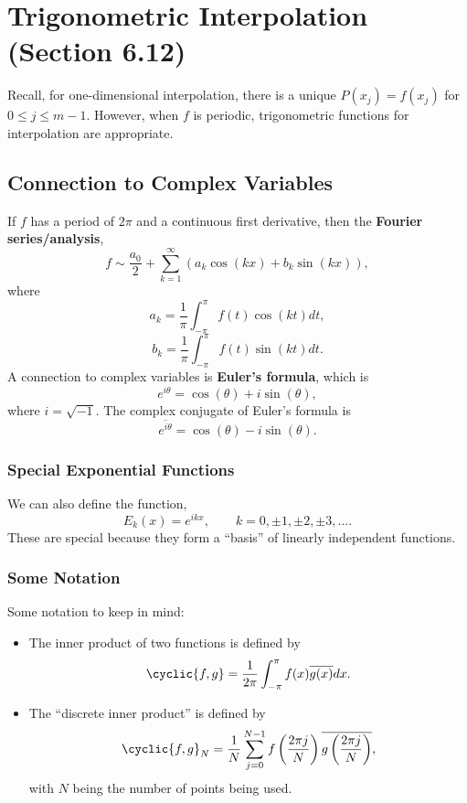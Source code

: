 \documentclass[letterpaper]{article}
\begin{document}
\section{Trigonometric Interpolation (Section 6.12)}
Recall, for one-dimensional interpolation, there is a unique $P(x_j) = f(x_j)$ for $0 \leq j \leq m - 1$. However, when $f$ is periodic, trigonometric functions for interpolation are appropriate.

\subsection{Connection to Complex Variables}
If $f$ has a period of $2\pi$ and a continuous first derivative, then the \textbf{Fourier series/analysis}, 
\[ f \sim \frac{a_0}{2} + \sum_{k = 1}^{\infty} (a_{k} \cos(kx) + b_k \sin(kx)), \]
where \[a_k = \frac{1}{\pi} \int_{-\pi}^{\pi} f(t)\cos(kt) dt,\]
\[b_k = \frac{1}{\pi} \int_{-\pi}^{\pi} f(t) \sin(kt) dt.\]
A connection to complex variables is \textbf{Euler's formula}, which is 
\[e^{i\theta} = \cos(\theta) + i\sin(\theta),\] where $i = \sqrt{-1}$. The complex conjugate of Euler's formula is 
\[\overline{e^{i\theta}} = \cos(\theta) - i\sin(\theta).\]

\subsubsection{Special Exponential Functions}
We can also define the function, 
\[E_{k}(x) = e^{ikx}, \qquad k = 0, \pm 1, \pm 2, \pm 3, \hdots.\]
These are special because they form a ``basis'' of linearly independent functions.

\subsubsection{Some Notation}
Some notation to keep in mind: 
\begin{itemize}
    \item The inner product of two functions is defined by
    \[\cyclic{f, g} = \frac{1}{2\pi} \int_{-\pi}^{\pi} f(x) \overline{g(x)} dx.\]

    \item The ``discrete inner product'' is defined by
    \[\cyclic{f, g}_{N} = \frac{1}{N} \sum_{j = 0}^{N - 1} f\left(\frac{2\pi j}{N}\right) \overline{g\left(\frac{2\pi j}{N}\right)},\]
    with $N$ being the number of points being used.
\end{itemize}
\end{document}
